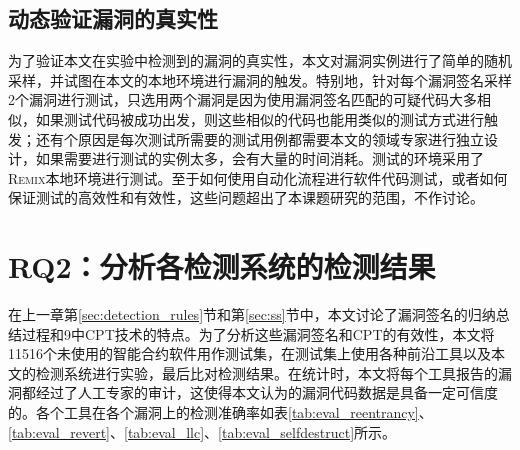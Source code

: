 \subsection{动态验证漏洞的真实性}

为了验证本文在实验中检测到的漏洞的真实性，本文对漏洞实例进行了简单的随机采样，并试图在本文的本地环境进行漏洞的触发。特别地，针对每个漏洞签名采样2个漏洞进行测试，只选用两个漏洞是因为使用漏洞签名匹配的可疑代码大多相似，如果测试代码被成功出发，则这些相似的代码也能用类似的测试方式进行触发；还有个原因是每次测试所需要的测试用例都需要本文的领域专家进行独立设计，如果需要进行测试的实例太多，会有大量的时间消耗。测试的环境采用了\textsc{Remix}本地环境进行测试。至于如何使用自动化流程进行软件代码测试，或者如何保证测试的高效性和有效性，这些问题超出了本课题研究的范围，不作讨论。

\section{RQ2：分析各检测系统的检测结果}

在上一章第\ref{sec:detection_rules}节和第\ref{sec:ss}节中，本文讨论了漏洞签名的归纳总结过程和9中CPT技术的特点。为了分析这些漏洞签名和CPT的有效性，本文将11516个未使用的智能合约软件用作测试集，在测试集上使用各种前沿工具以及本文的检测系统进行实验，最后比对检测结果。在统计时，本文将每个工具报告的漏洞都经过了人工专家的审计，这使得本文认为的漏洞代码数据是具备一定可信度的。各个工具在各个漏洞上的检测准确率如表\ref{tab:eval_reentrancy}、\ref{tab:eval_revert}、\ref{tab:eval_llc}、\ref{tab:eval_selfdestruct}所示。

